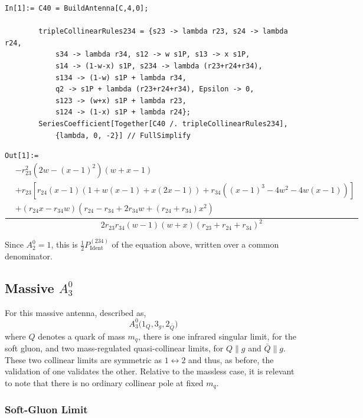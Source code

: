 \begin{mdframed}[backgroundcolor=gray!10, linewidth=0pt]
\begin{lstlisting}
In[1]:= C40 = BuildAntenna[C,4,0];

        tripleCollinearRules234 = {s23 -> lambda r23, s24 -> lambda r24,
            s34 -> lambda r34, s12 -> w s1P, s13 -> x s1P,
            s14 -> (1-w-x) s1P, s234 -> lambda (r23+r24+r34),
            s134 -> (1-w) s1P + lambda r34,
            q2 -> s1P + lambda (r23+r24+r34), Epsilon -> 0,
            s123 -> (w+x) s1P + lambda r23,
            s124 -> (1-x) s1P + lambda r24};
        SeriesCoefficient[Together[C40 /. tripleCollinearRules234],
            {lambda, 0, -2}] // FullSimplify
\end{lstlisting}
\texttt{Out[1]:=}
    \begin{equation*}
        \frac{\begin{aligned}
            &-r_{23}^2\left(2w-(x-1)^2\right)(w+x-1)\\
            &+r_{23}\left[r_{24}(x-1)\left(1+w(x-1)+x(2x-1)\right)+r_{34}\left((x-1)^3-4w^2-4w(x-1)\right)\right]\\
            &+(r_{24}x-r_{34}w)\left(r_{24}-r_{34}+2r_{34}w+(r_{24}+r_{34})x^2\right)
        \end{aligned}}{2r_{23}r_{34}(w-1)(w+x)(r_{23}+r_{24}+r_{34})^2}
    \end{equation*}
\end{mdframed}
Since $A_2^0=1$, this is $\tfrac12P_\mathrm{Ident}^{(234)}$ of the equation above, written over a common denominator.


\subsection{Massive $A_3^0$}\label{subsec:localValidationMassiveA30}

For this massive antenna, described as,
\begin{equation}
    A_3^0\Big(1_Q,3_g,2_{\bar Q}\Big)
\end{equation}
where $Q$ denotes a quark of mass $m_q$, there is one infrared singular limit, for the soft gluon, 
and two mass-regulated quasi-collinear limits, for $Q\parallel g$ and $\bar Q\parallel g$. These two collinear limits 
are symmetric as $1\leftrightarrow2$ and thus, as before, the validation of one validates the other.
Relative to the massless case, it is relevant to note that there is no ordinary collinear pole
at fixed $m_q$.

\subsubsection{Soft-Gluon Limit}

